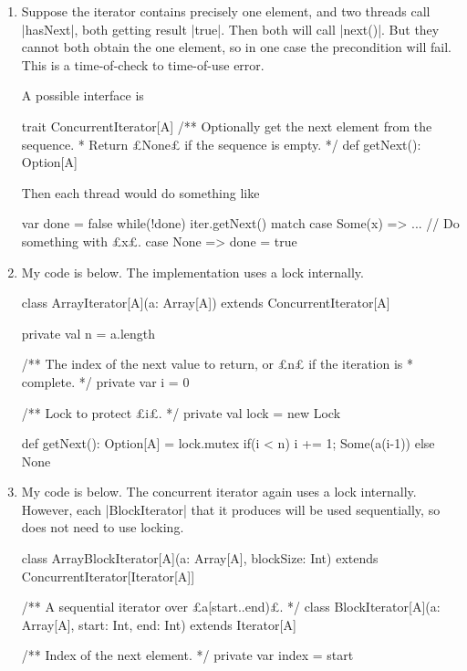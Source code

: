 \begin{answerI}
\begin{enumerate}
\item
Suppose the iterator contains precisely one element, and two threads call
|hasNext|, both getting result |true|.  Then both will call |next()|.  But
they cannot both obtain the one element, so in one case the precondition will
fail.  This is a time-of-check to time-of-use error.

A possible interface is
\begin{scala}
trait ConcurrentIterator[A]{
  /** Optionally get the next element from the sequence.  
    * Return £None£ if the sequence is empty. */
  def getNext(): Option[A]
}
\end{scala}

Then each thread would do something like
\begin{scala}
var done = false
while(!done) iter.getNext() match{
  case Some(x) => ... // Do something with £x£.
  case None => done = true
}
\end{scala}


\item %
My code is below.  The implementation uses a lock internally.
%
\begin{scala}
class ArrayIterator[A](a: Array[A]) extends ConcurrentIterator[A]{
  private val n = a.length

  /** The index of the next value to return, or £n£ if the iteration is
    * complete. */
  private var i = 0

  /** Lock to protect £i£. */
  private val lock = new Lock

  def getNext(): Option[A] = lock.mutex{
    if(i < n){ i += 1; Some(a(i-1)) } else None
  }
}
\end{scala}


\item
My code is below.  The concurrent iterator again uses a lock internally.
However, each |BlockIterator| that it produces will be used sequentially, so
does not need to use locking.  
%
\begin{scala}
class ArrayBlockIterator[A](a: Array[A], blockSize: Int)
    extends ConcurrentIterator[Iterator[A]]{

  /** A sequential iterator over £a[start..end)£. */
  class BlockIterator[A](a: Array[A], start: Int, end: Int) extends Iterator[A]{
    /** Index of the next element. */
    private var index = start

}}
\end{scala}
\end{enumerate}
\end{answerI}
